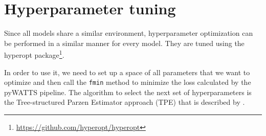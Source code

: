 \section{Hyperparameter tuning}

Since all models share a similar environment, 
hyperparameter optimization can be performed in a similar manner for every model.
They are tuned using the 
hyperopt package\footnote{\url{https://github.com/hyperopt/hyperopt}}.

In order to use it, we need to set up a space of 
all parameters that we want to optimize and 
then call the \texttt{fmin} method to minimize the loss 
calculated by the pyWATTS pipeline. 
The algorithm to select the next set of hyperparameters is 
the Tree-structured Parzen Estimator approach (TPE) 
that is described by \Textcite{Bergstra2011}.